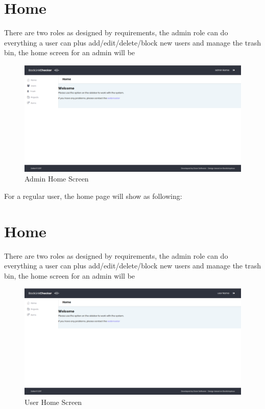 \section{Home}
There are two roles as designed by requirements, the admin role can do everything a user can plus add/edit/delete/block new users and manage the trash bin, the home screen for an admin will be
\begin{figure}[H]
	\caption{Admin Home Screen}
	\label{img:admin}
	\includegraphics[width=\textwidth]{images/admin_screenshot}
\end{figure}

For a regular user, the home page will show as following:
\section{Home}
There are two roles as designed by requirements, the admin role can do everything a user can plus add/edit/delete/block new users and manage the trash bin, the home screen for an admin will be
\begin{figure}[H]
	\caption{User Home Screen}
	\label{img:home}
	\includegraphics[width=\textwidth]{images/users_home}
\end{figure}

